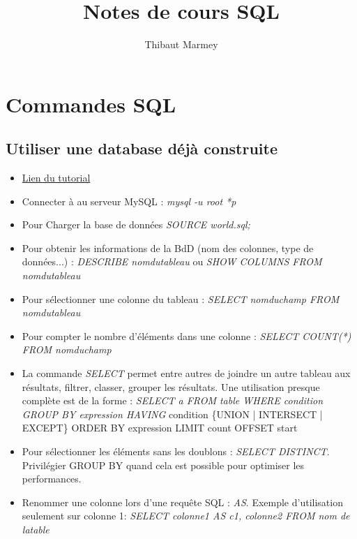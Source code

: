 \documentclass[12pt,a4paper]{article}
\author{Thibaut Marmey}
\title{Notes de cours SQL}
\begin{document}
	\maketitle

\section{Commandes SQL}
\subsection{Utiliser une database déjà construite}
\begin{itemize}
\item \href{https://dev.mysql.com/doc/world-setup/en/world-setup-installation.html}{Lien du tutorial}
\item Connecter à au serveur MySQL : \textit{mysql -u root *p}
\item Pour Charger la base de données \textit{SOURCE world.sql;}
\item Pour obtenir les informations de la BdD (nom des colonnes, type de données...) : \textit{DESCRIBE nom\textunderscore du\textunderscore tableau} ou \textit{SHOW COLUMNS FROM nom\textunderscore du\textunderscore tableau}
\item Pour sélectionner une colonne du tableau : \textit{SELECT nom\textunderscore du\textunderscore champ FROM nom\textunderscore du\textunderscore tableau}
\item Pour compter le nombre d'éléments dans une colonne : \textit{SELECT COUNT(*) FROM nom\textunderscore du\textunderscore champ}
\item La commande \textit{SELECT} permet entre autres de joindre un autre tableau aux résultats, filtrer, classer, grouper les résultats. Une utilisation presque complète est de la forme : 
\newline  \colorbox{blue!15}{\textit{SELECT a FROM table WHERE condition GROUP BY expression HAVING}} 
\newline \colorbox{blue!15}{condition \{UNION | INTERSECT | EXCEPT\} ORDER BY expression LIMIT}
\newline \colorbox{blue!15}{count OFFSET start}
\item Pour sélectionner les éléments sans les doublons : \textit{SELECT DISTINCT}. Privilégier GROUP BY quand cela est possible pour optimiser les performances.
\item Renommer une colonne lors d'une requête SQL : \textit{AS}.
\newline Exemple d'utilisation seulement sur colonne 1: \textit{SELECT colonne1 AS c1, colonne2 FROM nom \textunderscore de \textunderscore la\textunderscore table}

\end{itemize}
\end{document}
